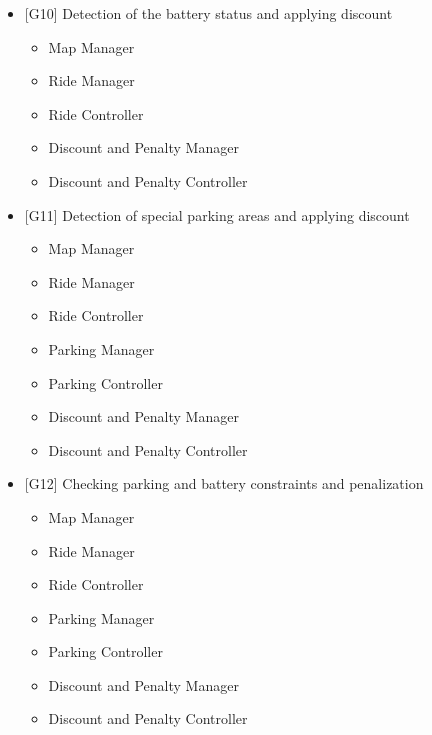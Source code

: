 \begin{itemize}
	\item {[}G10{]} Detection of the battery status and applying discount
	\begin{itemize}
		\item Map Manager
		\item Ride Manager
		\item Ride Controller
		\item Discount and Penalty Manager
		\item Discount and Penalty Controller
	\end{itemize}

	\item {[}G11{]} Detection of special parking areas and applying discount
	\begin{itemize}
		\item Map Manager
		\item Ride Manager
		\item Ride Controller
		\item Parking Manager
		\item Parking Controller
		\item Discount and Penalty Manager
		\item Discount and Penalty Controller
	\end{itemize}

	\item {[}G12{]} Checking parking and battery constraints and penalization
	\begin{itemize}
		\item Map Manager
		\item Ride Manager
		\item Ride Controller
		\item Parking Manager
		\item Parking Controller
		\item Discount and Penalty Manager
		\item Discount and Penalty Controller
	\end{itemize}
\end{itemize}